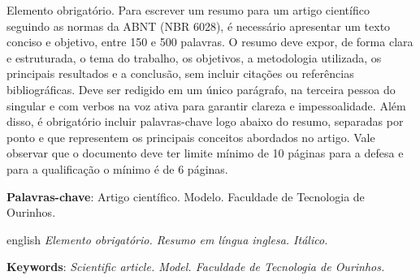 \documentclass[
	article,             %
	12pt,                %
	oneside,             %
	a4paper,             %
	english,             %
	brazil,              %
	sumario=tradicional
]{abntex2}
\begin{document}

\frenchspacing


%
%

\maketitle

\begin{resumoumacoluna}
Elemento obrigatório. Para escrever um resumo para um artigo científico seguindo as normas da ABNT (NBR 6028), é necessário apresentar um texto conciso e objetivo, entre 150 e 500 palavras. O resumo deve expor, de forma clara e estruturada, o tema do trabalho, os objetivos, a metodologia utilizada, os principais resultados e a conclusão, sem incluir citações ou referências bibliográficas. Deve ser redigido em um único parágrafo, na terceira pessoa do singular e com verbos na voz ativa para garantir clareza e impessoalidade. Além disso, é obrigatório incluir palavras-chave logo abaixo do resumo, separadas por ponto e que representem os principais conceitos abordados no artigo. Vale observar que o documento deve ter limite mínimo de 10 páginas para a defesa e para a qualificação o mínimo é de 6 páginas.

\vspace{\onelineskip}

\noindent
\textbf{Palavras-chave}: Artigo científico. Modelo. Faculdade de Tecnologia de Ourinhos.
\end{resumoumacoluna}

\renewcommand{\resumoname}{ABSTRACT}
\begin{resumoumacoluna}
	\begin{otherlanguage*}{english}
		\textit{Elemento obrigatório. Resumo em língua inglesa. Itálico.}
		\vspace{\onelineskip}

		\noindent
		\textbf{Keywords}: \textit{Scientific article. Model. Faculdade de Tecnologia de Ourinhos.}
	\end{otherlanguage*}  
\end{resumoumacoluna}
\end{document}
